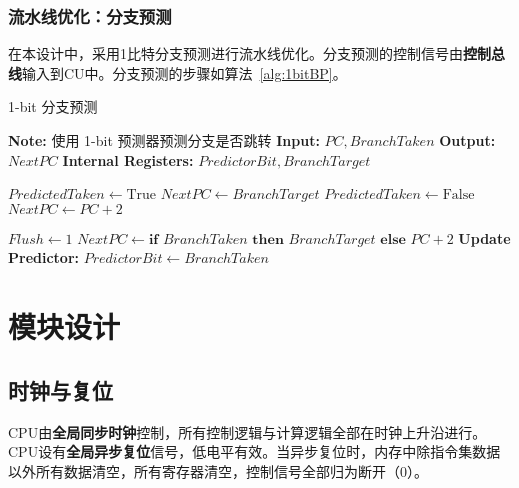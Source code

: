 \documentclass[lang=cn,a4paper,newtx]{elegantpaper}
\begin{document}
\subsubsection{流水线优化：分支预测}
在本设计中，采用1比特分支预测进行流水线优化。分支预测的控制信号由\textbf{控制总线}输入到CU中。分支预测的步骤如算法~\ref{alg:1bitBP}。

\begin{algorithm}[htbp]
  \caption{1-bit 分支预测}
  \label{alg:1bitBP}
  \begin{algorithmic}[1]
  \State \textbf{Note:} 使用 1-bit 预测器预测分支是否跳转
  \State \textbf{Input:} $PC, BranchTaken$
  \State \textbf{Output:} $NextPC$
  \State \textbf{Internal Registers:} $PredictorBit, BranchTarget$

          \State $PredictedTaken \gets \text{True}$
          \State $NextPC \gets BranchTarget$
      \Else
          \State $PredictedTaken \gets \text{False}$
          \State $NextPC \gets PC + 2$
      \EndIf
  \EndProcedure

        
          \State $Flush \gets 1$  
          \State $NextPC \gets \textbf{if } BranchTaken \textbf{ then } BranchTarget \textbf{ else } PC + 2$
      \EndIf
      \State \textbf{Update Predictor:}
      \State $PredictorBit \gets BranchTaken$  
  \EndProcedure
  \end{algorithmic}
\end{algorithm}



\section{模块设计}
\subsection{时钟与复位}
CPU由\textbf{全局同步时钟}控制，所有控制逻辑与计算逻辑全部在时钟上升沿进行。CPU设有\textbf{全局异步复位}信号，低电平有效。当异步复位时，内存中除指令集数据以外所有数据清空，所有寄存器清空，控制信号全部归为断开（0）。
\end{document}

